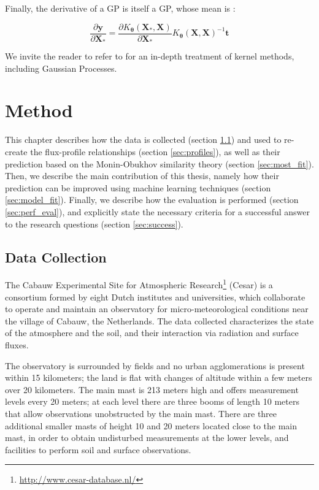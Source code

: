 \documentclass[12pt]{book}
\begin{document}
Finally, the derivative of a GP is itself a GP, whose mean is \citep{gp_diff}:

\begin{equation}
\label{eq:gp_gradient}
\frac{\partial\bm y}{\partial\bm X_*}=\frac{\partial K_{\bm\theta}(\bm X_*,\bm X)}{\partial\bm X_*}K_{\bm\theta}(\bm X,\bm X)^{-1}\bm t
\end{equation}

We invite the reader to refer to \cite[Chapter~6]{bishop} for an in-depth treatment of kernel methods, including Gaussian Processes.


\chapter{Method}
\label{ch:method}
This chapter describes how the data is collected (section \ref{sec:data_collection}) and used to re-create the flux-profile relationships (section \ref{sec:profiles}), as well as their prediction based on the Monin-Obukhov similarity theory (section \ref{sec:most_fit}). Then, we describe the main contribution of this thesis, namely how their prediction can be improved using machine learning techniques (section \ref{sec:model_fit}). Finally, we describe how the evaluation is performed (section \ref{sec:perf_eval}), and explicitly state the necessary criteria for a successful answer to the research questions (section  \ref{sec:success}).

\section{Data Collection}
\label{sec:data_collection}
The Cabauw Experimental Site for Atmospheric Research\footnote{\url{http://www.cesar-database.nl/}} (Cesar) is a consortium formed by eight Dutch institutes and universities, which collaborate to operate and maintain an observatory for micro-meteorological conditions near the village of Cabauw, the Netherlands. The data collected characterizes the state of the atmosphere and the soil, and their interaction via radiation and surface fluxes.

The observatory is surrounded by fields and no urban agglomerations is present within 15 kilometers; the land is flat with changes of altitude within a few meters over 20 kilometers. The main mast is 213 meters high and offers measurement levels every 20 meters; at each level there are three booms of length 10 meters that allow observations unobstructed by the main mast. There are three additional smaller masts of height 10 and 20 meters located close to the main mast, in order to obtain undisturbed measurements at the lower levels, and facilities to perform soil and surface observations.
\end{document}
